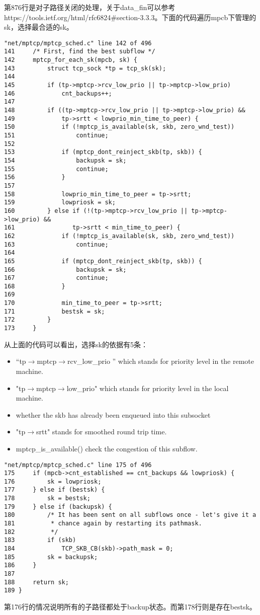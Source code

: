 第876行是对子路径关闭的处理，关于data\_fin可以参考https://tools.ietf.org/html/rfc6824\#section-3.3.3。下面的代码遍历mpcb下管理的sk，选择最合适的sk。
\small\begin{verbatim}
"net/mptcp/mptcp_sched.c" line 142 of 496
141     /* First, find the best subflow */
142     mptcp_for_each_sk(mpcb, sk) {
143         struct tcp_sock *tp = tcp_sk(sk);
144
145         if (tp->mptcp->rcv_low_prio || tp->mptcp->low_prio)
146             cnt_backups++;
147
148         if ((tp->mptcp->rcv_low_prio || tp->mptcp->low_prio) &&
149             tp->srtt < lowprio_min_time_to_peer) {
150             if (!mptcp_is_available(sk, skb, zero_wnd_test))
151                 continue;
152
153             if (mptcp_dont_reinject_skb(tp, skb)) {
154                 backupsk = sk;
155                 continue;
156             }
157
158             lowprio_min_time_to_peer = tp->srtt;
159             lowpriosk = sk;
160         } else if (!(tp->mptcp->rcv_low_prio || tp->mptcp->low_prio) &&
161                tp->srtt < min_time_to_peer) {
162             if (!mptcp_is_available(sk, skb, zero_wnd_test))
163                 continue;
164
165             if (mptcp_dont_reinject_skb(tp, skb)) {
166                 backupsk = sk;
167                 continue;
168             }
169
170             min_time_to_peer = tp->srtt;
171             bestsk = sk;
172         }
173     }
\end{verbatim}\normalsize
从上面的代码可以看出，选择sk的依据有5条：
\begin{itemize}
  \item “tp$\rightarrow$mptcp$\rightarrow$rcv\_low\_prio ” which stands for priority level in the remote machine.
  \item "tp$\rightarrow$mptcp$\rightarrow$low\_prio" which stands for priority level in the local machine.
  \item whether the skb has already been enqueued into this subsocket
  \item "tp$\rightarrow$srtt" stands for smoothed round trip time.
  \item mptcp\_is\_available() check the congestion of this subflow.
\end{itemize}
\small\begin{verbatim}
"net/mptcp/mptcp_sched.c" line 175 of 496
175     if (mpcb->cnt_established == cnt_backups && lowpriosk) {
176         sk = lowpriosk;
177     } else if (bestsk) {
178         sk = bestsk;
179     } else if (backupsk) {
180         /* It has been sent on all subflows once - let's give it a
181          * chance again by restarting its pathmask.
182          */
183         if (skb)
184             TCP_SKB_CB(skb)->path_mask = 0;
185         sk = backupsk;
186     }
187
188     return sk;
189 }
\end{verbatim}\normalsize
第176行的情况说明所有的子路径都处于backup状态。而第178行则是存在bestsk。

